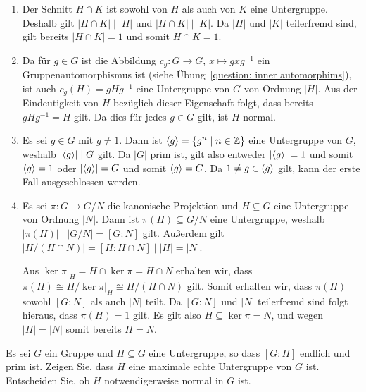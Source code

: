 \begin{solution}
  \begin{enumerate}
    \item
      Der Schnitt $H \cap K$ ist sowohl von $H$ als auch von $K$ eine Untergruppe.
      Deshalb gilt $|H \cap K| \mid |H|$ und $|H \cap K| \mid |K|$.
      Da $|H|$ und $|K|$ teilerfremd sind, gilt bereits $|H \cap K| = 1$ und somit $H \cap K = 1$.
      
    \item
      Da für $g \in G$ ist die Abbildung $c_g \colon G \to G$, $x \mapsto gxg^{-1}$ ein Gruppenautomorphismus ist (siehe Übung~\ref{question: inner automorphims}), ist auch $c_g(H) = gHg^{-1}$ eine Untergruppe von $G$ von Ordnung $|H|$.
      Aus der Eindeutigkeit von $H$ bezüglich dieser Eigenschaft folgt, dass bereits $g H g^{-1} = H$ gilt.
      Da dies für jedes $g \in G$ gilt, ist $H$ normal.
    
    \item
      Es sei $g \in G$ mit $g \neq 1$.
      Dann ist $\langle g\rangle = \{g^n \mid n \in \mathbb{Z}\}$ eine Untergruppe von $G$, weshalb $|{\langle g\rangle}| \mid G$ gilt.
      Da $|G|$ prim ist, gilt also entweder $|{\langle g\rangle}| = 1$ und somit $\langle g\rangle = 1$ oder $|{\langle g\rangle}| = G$ und somit $\langle g\rangle = G$.
      Da $1 \neq g \in \langle g\rangle$ gilt, kann der erste Fall ausgeschlossen werden.
    
    \item
      Es sei $\pi \colon G \to G/N$ die kanonische Projektion und $H \subseteq G$ eine Untergruppe von Ordnung $|N|$.
      Dann ist $\pi(H) \subseteq G/N$ eine Untergruppe, weshalb $|\pi(H)| \mid |G/N| = [G : N]$ gilt.
      Außerdem gilt $|H/(H \cap N)| = [H : H \cap N] \mid |H| = |N|$.
      
      Aus $\ker \pi|_H = H \cap \ker \pi = H \cap N$ erhalten wir, dass $\pi(H) \cong H / \ker \pi|_H \cong H / (H \cap N)$ gilt.
      Somit erhalten wir, dass $\pi(H)$ sowohl $[G : N]$ als auch $|N|$ teilt.
      Da $[G : N]$ und $|N|$ teilerfremd sind folgt hieraus, dass $\pi(H) = 1$ gilt.
      Es gilt also $H \subseteq \ker \pi = N$, und wegen $|H| = |N|$ somit bereits $H = N$.
  \end{enumerate}
\end{solution}


\begin{question}[subtitle = Ein Kriterium für maximale Untergruppen]
  Es sei $G$ ein Gruppe und $H \subseteq G$ eine Untergruppe, so dass $[G : H]$ endlich und prim ist.
  Zeigen Sie, dass $H$ eine maximale echte Untergruppe von $G$ ist. Entscheiden Sie, ob $H$ notwendigerweise normal in $G$ ist.
\end{question}


